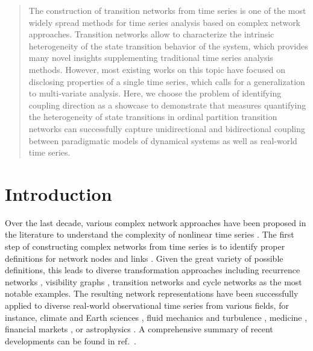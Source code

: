 \documentclass[12pt,aip,cha,reprint,nofootinbib]{revtex4-1}
\begin{document}
\maketitle

\begin{quotation} 
The construction of transition networks from time series is one of the most widely spread methods for time series analysis based on complex network approaches. Transition networks allow to characterize the intrinsic heterogeneity of the state transition behavior of the system, which provides many novel insights supplementing traditional time series analysis methods. However, most existing works on this topic have focused on disclosing properties of a single time series, which calls for a generalization to multi-variate analysis. Here, we choose the problem of identifying coupling direction as a showcase to demonstrate that measures quantifying the heterogeneity of state transitions in ordinal {\color{red}partition} transition networks can successfully capture unidirectional and bidirectional coupling between paradigmatic models of dynamical systems as well as real-world time series. 
\end{quotation}

\section{Introduction}
Over the last decade, various complex network approaches have been proposed in the literature to understand the complexity of nonlinear time series \cite{Bradley2015c,Kantz97,ZouPR2018}. The first step of constructing complex networks from time series is to identify proper definitions for network nodes and links \cite{ZouPR2018}. Given the great variety of possible definitions, this leads to diverse transformation approaches including recurrence networks \cite{Marwan2009,Donner2010NJP}, visibility graphs \cite{Lacasa2008}, transition networks \cite{Nicolis2005,McCullough2015} and cycle networks \cite{Zhang2006} as the most notable examples. The resulting network representations have been successfully applied to diverse real-world observational time series from various fields, for instance, climate and Earth sciences \cite{Donges2011PNAS,Elsner2009,schleussner2015indications}, fluid mechanics and turbulence \cite{Liu2009,Gorski2015,Gao2015a,Gao2016b,Manshour2015a}, medicine \cite{Ramirez2013,Subramaniyam2015}, financial markets \cite{Flanagan2016}, or astrophysics \cite{Zou2014a,Zou2014}. A comprehensive summary of recent developments can be found in ref.~\cite{ZouPR2018}.
\end{document}
